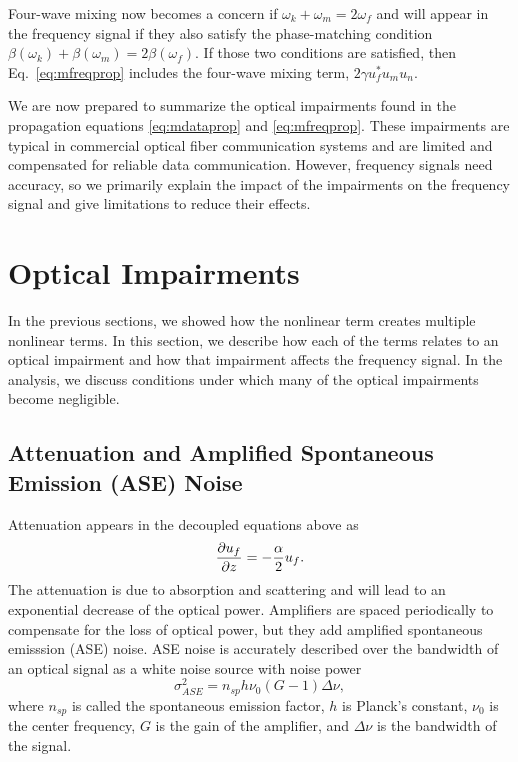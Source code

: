 Four-wave mixing now becomes a concern if $\omega_k + \omega_m = 2\omega_f$ and will appear in the frequency signal if they also satisfy the phase-matching condition $\beta(\omega_k) + \beta(\omega_m) = 2\beta(\omega_f)$. If those two conditions are satisfied, then Eq.~\ref{eq:mfreqprop} includes the four-wave mixing term, $2\gamma u_f^*u_mu_n$.

We are now prepared to summarize the optical impairments found in the propagation equations \ref{eq:mdataprop} and \ref{eq:mfreqprop}. These impairments are typical in commercial optical fiber communication systems and are limited and compensated for reliable data communication. However, frequency signals need accuracy, so we primarily explain the impact of the impairments on the frequency signal and give limitations to reduce their effects.

\section{Optical Impairments} \label{sec:impair}

In the previous sections, we showed how the nonlinear term creates multiple nonlinear terms. In this section, we describe how each of the terms relates to an optical impairment and how that impairment affects the frequency signal. In the analysis, we discuss conditions under which many of the optical impairments become negligible.

\subsection{Attenuation and Amplified Spontaneous Emission (ASE) Noise}
%
Attenuation appears in the decoupled equations above as
%
\begin{equation}
\frac{\partial u_f}{\partial z} = -\frac{\alpha}{2}u_f.
\end{equation}
%
The attenuation is due to absorption and scattering and will lead to an exponential decrease of the optical power. Amplifiers are spaced periodically to compensate for the loss of optical power, but they add amplified spontaneous emisssion (ASE) noise. ASE noise is accurately described over the bandwidth of an optical signal as a white noise source with noise power \cite{agrawal2012fiber}
%
\begin{equation}
\sigma^2_{ASE} = n_{sp}h\nu_0 (G-1)\Delta\nu,
\end{equation}
%
where $n_{sp}$ is called the spontaneous emission factor, $h$ is Planck's constant, $\nu_0$ is the center frequency, $G$ is the gain of the amplifier, and $\Delta\nu$ is the bandwidth of the signal. 

